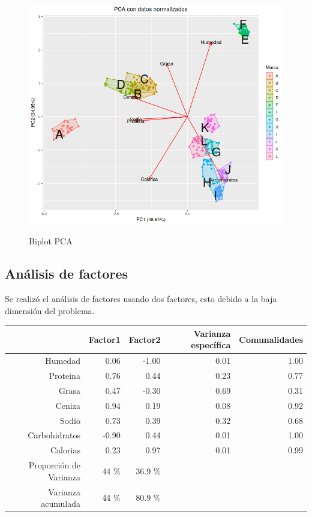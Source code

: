 \begin{figure}[h]
\centering
	\includegraphics[scale=.75]{images/biplotPCA.png} 
	\label{i_biplot_PCA}
	\caption{Biplot PCA}
\end{figure}


\subsection{Análisis de factores}

Se realizó el análisis de factores usando dos factores, esto debido a la baja dimensión del problema.


\begin{table}[ht]
\centering
\begin{tabular}{rrrrr}
  \hline
 & Factor1 & Factor2 & Varianza específica & Comunalidades \\ 
  \hline
Humedad & 0.06 & -1.00 & 0.01 & 1.00 \\ 
  Proteina & 0.76 & 0.44 & 0.23 & 0.77 \\ 
  Grasa & 0.47 & -0.30 & 0.69 & 0.31 \\ 
  Ceniza & 0.94 & 0.19 & 0.08 & 0.92 \\ 
  Sodio & 0.73 & 0.39 & 0.32 & 0.68 \\ 
  Carbohidratos & -0.90 & 0.44 & 0.01 & 1.00 \\ 
  Calorias & 0.23 & 0.97 & 0.01 & 0.99 \\     
  Proporción de Varianza  & 44 \% &  36.9 \% \\
  Varianza acumulada & 44 \% &  80.9 \% \\ 
   \hline
\end{tabular}
\end{table}